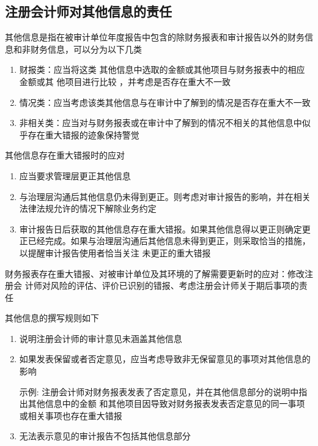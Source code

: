 \documentclass[UTF8,12pt]{ctexart}
\numberwithin{equation}{section} %
\numberwithin{figure}{section}
\numberwithin{table}{section}
\begin{document}
	\subsection{注册会计师对其他信息的责任}
	其他信息是指在被审计单位年度报告中包含的除财务报表和审计报告以外的财务信息和非财务信息，可以分为以下几类
	\begin{enumerate}
		\item 财报类：应当将这类  其他信息中选取的金额或其他项目与财务报表中的相应金额或其 他项目进行比较  ，并考虑是否存在重大不一致
		
		\item 情况类：应当考虑该类其他信息与在审计中了解到的情况是否存在重大不一致
		
		\item 非相关类：应当对与财务报表或在审计中了解到的情况不相关的其他信息中似乎存在重大错报的迹象保持警觉
	\end{enumerate}
	
	其他信息存在重大错报时的应对
	\begin{enumerate}
		\item 应当要求管理层更正其他信息
		
		\item 与治理层沟通后其他信息仍未得到更正。则考虑对审计报告的影响，并在相关法律法规允许的情况下解除业务约定
		
		\item 审计报告日后获取的其他信息存在重大错报。如果其他信息得以更正则确定更正已经完成。如果与治理层沟通后其他信息未得到更正，则采取恰当的措施，以提醒审计报告使用者恰当关注 未更正的重大错报
	\end{enumerate}
	
	
	
	财务报表存在重大错报、对被审计单位及其环境的了解需要更新时的应对：修改注册会 计师对风险的评估、评价已识别的错报、考虑注册会计师关于期后事项的责任
	
	其他信息的撰写规则如下
	\begin{enumerate}
		\item 说明注册会计师的审计意见未涵盖其他信息
		 
		\item 如果发表保留或者否定意见，应当考虑导致非无保留意见的事项对其他信息的影响
		
		示例: 注册会计师对财务报表发表了否定意见，并在其他信息部分的说明中指出其他信息中的金额 和其他项目因导致对财务报表发表否定意见的同一事项或相关事项也存在重大错报
		
		\item 无法表示意见的审计报告不包括其他信息部分
	\end{enumerate}
	
\end{document}
